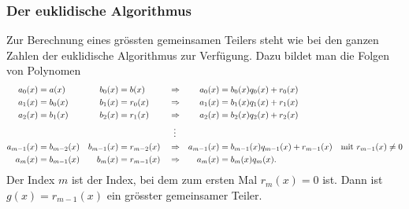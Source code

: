 \subsubsection{Der euklidische Algorithmus}
Zur Berechnung eines grössten gemeinsamen Teilers steht wie bei den
ganzen Zahlen der euklidische Algorithmus zur Verfügung.
Dazu bildet man die Folgen von Polynomen
\[
\begin{aligned}
a_0(x)&=a(x) & b_0(x) &= b(x)
&
&\Rightarrow&
a_0(x)&=b_0(x) q_0(x) + r_0(x) &&
\\
a_1(x)&=b_0(x) & b_1(x) &= r_0(x)
&
&\Rightarrow&
a_1(x)&=b_1(x) q_1(x) + r_1(x) &&
\\
a_2(x)&=b_1(x) & b_2(x) &= r_1(x)
&
&\Rightarrow&
a_2(x)&=b_2(x) q_2(x) + r_2(x) &&
\\
&&&&&\hspace*{2mm}\vdots&&
\\
a_{m-1}(x)&=b_{m-2}(x) & b_{m-1}(x) &= r_{m-2}(x) 
&
&\Rightarrow&
a_{m-1}(x)&=b_{m-1}(x)q_{m-1}(x) + r_{m-1}(x) &\text{mit }r_{m-1}(x)&\ne 0
\\
a_m(x)&=b_{m-1}(x) & b_m(x)&=r_{m-1}(x)
&
&\Rightarrow&
a_m(x)&=b_m(x)q_m(x).&&
\end{aligned}
\]
Der Index $m$ ist der Index, bei dem zum ersten Mal $r_m(x)=0$ ist.
Dann ist $g(x)=r_{m-1}(x)$ ein grösster gemeinsamer Teiler.

